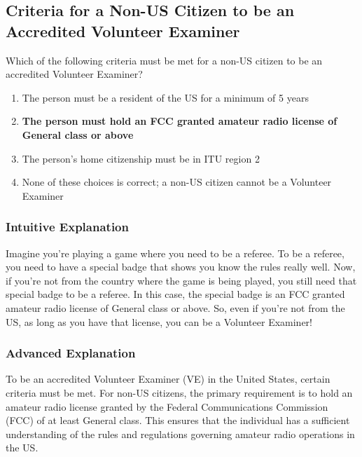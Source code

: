 \subsection{Criteria for a Non-US Citizen to be an Accredited Volunteer Examiner}
\label{G1D08}

\begin{tcolorbox}[colback=gray!10!white,colframe=black!75!black,title=G1D08]
Which of the following criteria must be met for a non-US citizen to be an accredited Volunteer Examiner?
\begin{enumerate}[label=\Alph*),noitemsep]
    \item The person must be a resident of the US for a minimum of 5 years
    \item \textbf{The person must hold an FCC granted amateur radio license of General class or above}
    \item The person’s home citizenship must be in ITU region 2
    \item None of these choices is correct; a non-US citizen cannot be a Volunteer Examiner
\end{enumerate}
\end{tcolorbox}

\subsubsection{Intuitive Explanation}
Imagine you're playing a game where you need to be a referee. To be a referee, you need to have a special badge that shows you know the rules really well. Now, if you're not from the country where the game is being played, you still need that special badge to be a referee. In this case, the special badge is an FCC granted amateur radio license of General class or above. So, even if you're not from the US, as long as you have that license, you can be a Volunteer Examiner!

\subsubsection{Advanced Explanation}
To be an accredited Volunteer Examiner (VE) in the United States, certain criteria must be met. For non-US citizens, the primary requirement is to hold an amateur radio license granted by the Federal Communications Commission (FCC) of at least General class. This ensures that the individual has a sufficient understanding of the rules and regulations governing amateur radio operations in the US.

